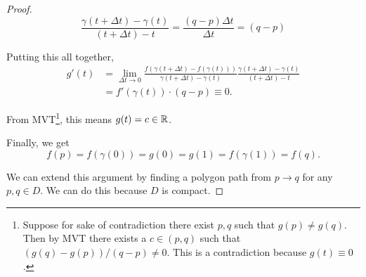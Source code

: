 \begin{proof}
    \[ \frac{\gamma(t + \Delta t) - \gamma(t)}{(t + \Delta t) - t}
    = \frac{(q-p)\Delta t}{\Delta t} = (q-p) \]

    Putting this all together,
    \begin{align*}
        g'(t) &= \lim_{\Delta t \to 0} \frac{f(\gamma(t+\Delta t) - f(\gamma(t)))}{\gamma(t + \Delta t) - \gamma(t)}\frac{\gamma(t + \Delta t) - \gamma(t)}{(t + \Delta t) - t} \\
        &= f'(\gamma(t))\cdot(q-p) \equiv 0.
    \end{align*}

    From MVT\footnote{Suppose for sake of contradiction there exist $p,q$ such that $g(p) \ne g(q)$.  Then by MVT there exists a $c \in (p,q)$ such that $(g(q)-g(p))/(q-p) \ne 0$.  This is a contradiction because $g(t) \equiv 0$.}, this means $g(t) = c \in \operatorname{\mathbb{R}}$.
    
    Finally, we get
    \[ f(p) = f(\gamma(0)) = g(0) = g(1) = f(\gamma(1)) = f(q). \]

    We can extend this argument by finding a polygon path from $p \to q$ for any $p,q \in D$.
    We can do this because $D$ is compact.




\end{proof}

